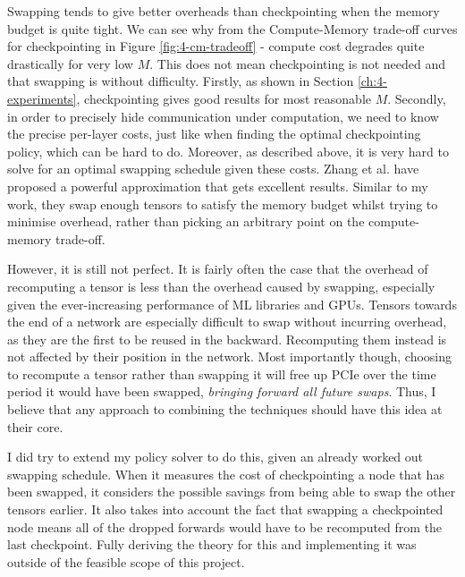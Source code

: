 Swapping tends to give better overheads than checkpointing when the memory budget is quite tight.
We can see why from the Compute-Memory trade-off curves for checkpointing in Figure \ref{fig:4-cm-tradeoff} - compute cost degrades quite drastically for very low \(M\).
This does not mean checkpointing is not needed and that swapping is without difficulty.
Firstly, as shown in Section \ref{ch:4-experiments}, checkpointing gives good results for most reasonable \(M\).
Secondly, in order to precisely hide communication under computation, we need to know the precise per-layer costs, just like when finding the optimal checkpointing policy, which can be hard to do.
Moreover, as described above, it is very hard to solve for an optimal swapping schedule given these costs.
Zhang et al. \cite{Zhang2019} have proposed a powerful approximation that gets excellent results.
Similar to my work, they swap enough tensors to satisfy the memory budget whilst trying to minimise overhead, rather than picking an arbitrary point on the compute-memory trade-off.

However, it is still not perfect.
It is fairly often the case that the overhead of recomputing a tensor is less than the overhead caused by swapping, especially given the ever-increasing performance of ML libraries and GPUs.
Tensors towards the end of a network are especially difficult to swap without incurring overhead, as they are the first to be reused in the backward.
Recomputing them instead is not affected by their position in the network.
Most importantly though, choosing to recompute a tensor rather than swapping it will free up PCIe over the time period it would have been swapped, \textit{bringing forward all future swaps}.
Thus, I believe that any approach to combining the techniques should have this idea at their core.

I did try to extend my policy solver to do this, given an already worked out swapping schedule.
When it measures the cost of checkpointing a node that has been swapped, it considers the possible savings from being able to swap the other tensors earlier.
It also takes into account the fact that swapping a checkpointed node means all of the dropped forwards would have to be recomputed from the last checkpoint.
Fully deriving the theory for this and implementing it was outside of the feasible scope of this project.

